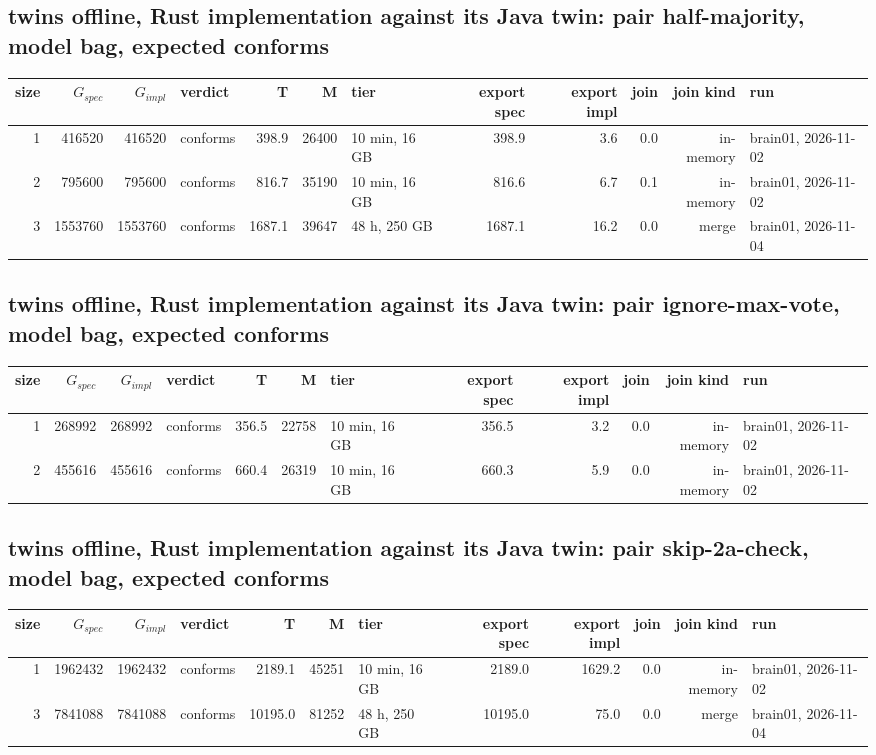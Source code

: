 \documentclass[10pt]{article}
\begin{document}
\subsection*{twins offline, Rust implementation against its Java twin: pair \textsf{half-majority}, model bag, expected conforms}
\begin{longtable}{@{}rrrlrrlrrrrl@{}}
\toprule
size & $G_{\mathit{spec}}$ & $G_{\mathit{impl}}$ & verdict & T & M & tier & export spec & export impl & join & join kind & run \\
\midrule
\endhead
\color{red} 1 & 416520 & 416520 & conforms & 398.9 & 26400 & 10 min, 16 GB & 398.9 & 3.6 & 0.0 & in-memory & brain01, 2026-11-02 \\
\color{red} 2 & 795600 & 795600 & conforms & 816.7 & 35190 & 10 min, 16 GB & 816.6 & 6.7 & 0.1 & in-memory & brain01, 2026-11-02 \\
\color{blue} 3 & 1553760 & 1553760 & conforms & 1687.1 & 39647 & 48 h, 250 GB & 1687.1 & 16.2 & 0.0 & merge & brain01, 2026-11-04 \\
\bottomrule
\end{longtable}
\subsection*{twins offline, Rust implementation against its Java twin: pair \textsf{ignore-max-vote}, model bag, expected conforms}
\begin{longtable}{@{}rrrlrrlrrrrl@{}}
\toprule
size & $G_{\mathit{spec}}$ & $G_{\mathit{impl}}$ & verdict & T & M & tier & export spec & export impl & join & join kind & run \\
\midrule
\endhead
\color{red} 1 & 268992 & 268992 & conforms & 356.5 & 22758 & 10 min, 16 GB & 356.5 & 3.2 & 0.0 & in-memory & brain01, 2026-11-02 \\
\color{red} 2 & 455616 & 455616 & conforms & 660.4 & 26319 & 10 min, 16 GB & 660.3 & 5.9 & 0.0 & in-memory & brain01, 2026-11-02 \\
\bottomrule
\end{longtable}
\subsection*{twins offline, Rust implementation against its Java twin: pair \textsf{skip-2a-check}, model bag, expected conforms}
\begin{longtable}{@{}rrrlrrlrrrrl@{}}
\toprule
size & $G_{\mathit{spec}}$ & $G_{\mathit{impl}}$ & verdict & T & M & tier & export spec & export impl & join & join kind & run \\
\midrule
\endhead
\color{red} 1 & 1962432 & 1962432 & conforms & 2189.1 & 45251 & 10 min, 16 GB & 2189.0 & 1629.2 & 0.0 & in-memory & brain01, 2026-11-02 \\
\color{blue} 3 & 7841088 & 7841088 & conforms & 10195.0 & 81252 & 48 h, 250 GB & 10195.0 & 75.0 & 0.0 & merge & brain01, 2026-11-04 \\
\bottomrule
\end{longtable}
\end{document}
